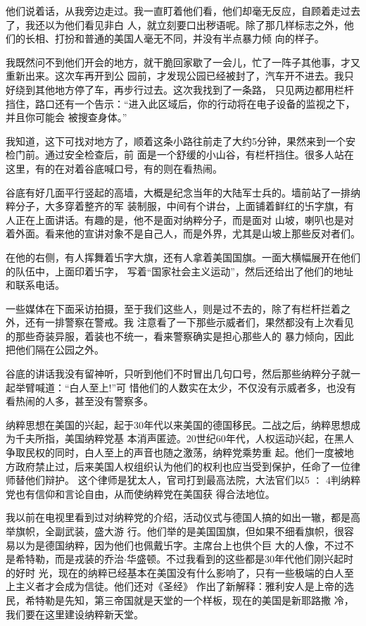 ﻿\documentclass[11pt]{article}
\begin{document}
他们说着话，从我旁边走过。我一直盯着他们看，他们却毫无反应，自顾着走过去了，我还以为他们看见非白
人，就立刻要口出秽语呢。除了那几样标志之外，他们的长相、打扮和普通的美国人毫无不同，并没有半点暴力倾
向的样子。

我既然问不到他们开会的地方，就干脆回家歇了一会儿，忙了一阵子其他事，才又重新出来。这次车再开到公
园前，才发现公园已经被封了，汽车开不进去。我只好绕到其他地方停了车，再步行过去。这次我找到了一条路，
只见两边都用栏杆挡住，路口还有一个告示：``进入此区域后，你的行动将在电子设备的监视之下，并且你可能会
被搜查身体。''

我知道，这下可找对地方了，顺着这条小路往前走了大约5分钟，果然来到一个安检门前。通过安全检查后，前
面是一个舒缓的小山谷，有栏杆挡住。很多人站在这里，有的在对着谷底喊口号，有的则在看热闹。

谷底有好几面平行竖起的高墙，大概是纪念当年的大陆军士兵的。墙前站了一排纳粹分子，大多穿着整齐的军
装制服，中间有个讲台，上面铺着鲜红的卐字旗，有人正在上面讲话。有趣的是，他不是面对纳粹分子，而是面对
山坡，喇叭也是对着外面。看来他的宣讲对象不是自己人，而是外界，尤其是山坡上那些反对者们。

在他的右侧，有人挥舞着卐字大旗，还有人拿着美国国旗。一面大横幅展开在他们的队伍中，上面印着卐字，
写着``国家社会主义运动''，然后还给出了他们的地址和联系电话。

一些媒体在下面采访拍摄，至于我们这些人，则是过不去的，除了有栏杆拦着之外，还有一排警察在警戒。我
注意看了一下那些示威者们，果然都没有上次看见的那些奇装异服，着装也不统一，看来警察确实是担心那些人的
暴力倾向，因此把他们隔在公园之外。

谷底的讲话我没有留神听，只听到他们不时冒出几句口号，然后那些纳粹分子就一起举臂喊道：``白人至上!''可
惜他们的人数实在太少，不仅没有示威者多，也没有看热闹的人多，甚至没有警察多。

纳粹思想在美国的兴起，起于30年代以来美国的德国移民。二战之后，纳粹思想成为千夫所指，美国纳粹党基
本消声匿迹。20世纪60年代，人权运动兴起，在黑人争取民权的同时，白人至上的声音也随之激荡，纳粹党乘势重
起。他们一度被地方政府禁止过，后来美国人权组织认为他们的权利也应当受到保护，任命了一位律师替他们辩护。
这个律师是犹太人，官司打到最高法院，大法官们以5 ∶ 4判纳粹党也有信仰和言论自由，从而使纳粹党在美国获
得合法地位。

我以前在电视里看到过对纳粹党的介绍，活动仪式与德国人搞的如出一辙，都是高举旗帜，全副武装，盛大游
行。他们举的是美国国旗，但如果不细看旗帜，很容易以为是德国纳粹，因为他们也佩戴卐字。主席台上也供个巨
大的人像，不过不是希特勒，而是戎装的乔治$\cdot$华盛顿。不过我看到的这些都是30年代他们刚兴起时的好时
光，现在的纳粹已经基本在美国没有什么影响了，只有一些极端的白人至上主义者才会成为信徒。他们还对《圣经》
作出了新解释：雅利安人是上帝的选民，希特勒是先知，第三帝国就是天堂的一个样板，现在的美国是新耶路撒
冷，我们要在这里建设纳粹新天堂。
\end{document}
